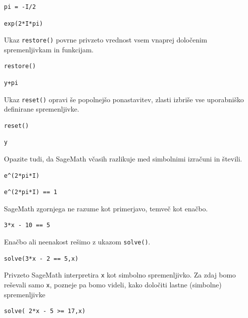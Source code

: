 \begin{verbatim}
pi = -I/2
\end{verbatim}

\begin{verbatim}
exp(2*I*pi)
\end{verbatim}

Ukaz \texttt{restore()} povrne privzeto vrednost vsem vnaprej določenim spremenljivkam in funkcijam.

\begin{verbatim}
restore()
\end{verbatim}

\begin{verbatim}
y+pi
\end{verbatim}

Ukaz \texttt{reset()} opravi še popolnejšo ponastavitev, zlasti izbriše vse uporabniško definirane spremenljivke.

\begin{verbatim}
reset()
\end{verbatim}

\begin{verbatim}
y
\end{verbatim}

Opazite tudi, da SageMath včasih razlikuje med simbolnimi izračuni in števili.

\begin{verbatim}
e^(2*pi*I)
\end{verbatim}

\begin{verbatim}
e^(2*pi*I) == 1
\end{verbatim}

SageMath zgornjega ne razume kot primerjavo, temveč kot enačbo.

\begin{verbatim}
3*x - 10 == 5
\end{verbatim}

Enačbo ali neenakost rešimo z ukazom \texttt{solve()}.

\begin{verbatim}
solve(3*x - 2 == 5,x)
\end{verbatim}

Privzeto SageMath interpretira \texttt{x} kot simbolno spremenljivko. Za zdaj bomo reševali samo \texttt{x}, pozneje pa bomo videli, kako določiti lastne (simbolne) spremenljivke

\begin{verbatim}
solve( 2*x - 5 >= 17,x)
\end{verbatim}

